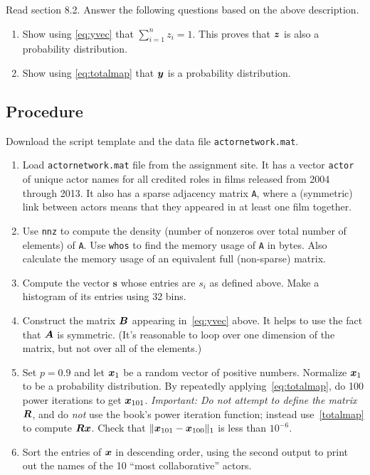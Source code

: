 \documentclass[11pt,twoside]{article}
\begin{document}
Read section 8.2. Answer the following questions based on the above description.

\begin{enumerate}
\item Show using \eqref{eq:yvec} that $\displaystyle \sum_{i=1}^n z_i = 1$. This proves that $\bm{z}$ is also a probability distribution.
  \item Show using \eqref{eq:totalmap} that $\bm{y}$ is a probability distribution. 
\end{enumerate}
 

    
\subsection*{Procedure}

Download the script template and the data file \texttt{actornetwork.mat}.

\begin{enumerate}
\item Load \texttt{actornetwork.mat} file from the assignment site. It has a vector \texttt{actor} of unique actor names for all credited roles in films released from 2004 through 2013. It also has a sparse adjacency matrix \texttt{A}, where a (symmetric) link between actors means that they appeared in at least one film together.
\item Use \texttt{nnz} to compute the density (number of nonzeros over total number of elements) of \texttt{A}. Use \texttt{whos} to find the memory usage of \texttt{A} in bytes. Also calculate the memory usage of an equivalent full (non-sparse) matrix. 
\item Compute the vector $\mathbf{s}$ whose entries are $s_i$ as defined above. Make a histogram of its entries using 32 bins.  
\item  Construct the matrix $\bm{B}$ appearing in~\eqref{eq:yvec} above. It helps to use the fact that $\bm{A}$ is symmetric. (It's reasonable to loop over one dimension of the matrix, but not over all of the elements.)
\item Set $p=0.9$ and let $\bm{x}_1$ be a random vector of positive numbers. Normalize $\bm{x}_1$ to be a probability distribution. By repeatedly applying~\eqref{eq:totalmap}, do 100 power iterations to get $\bm{x}_{101}$. \emph{Important: Do not attempt to define the matrix $\bm{R}$}, and do \emph{not} use the book's power iteration function; instead use~\eqref{totalmap} to compute $\bm{R}\bm{x}$. Check that $\|\bm{x}_{101}-\bm{x}_{100}\|_1$ is less than $10^{-6}$. 
\item Sort the entries of $\bm{x}$ in descending order, using the second output to print out the names of the 10 ``most collaborative'' actors. 
\end{enumerate}
\end{document}

